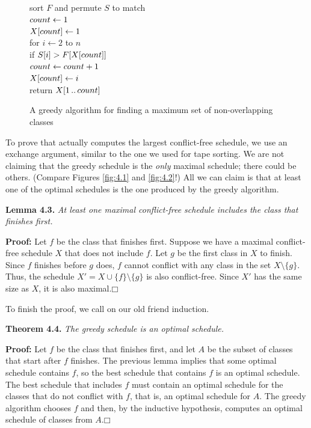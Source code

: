 \begin{figure}[ht]
\centering
\begin{pseudocode}
\\
sort $F$ and permute $S$ to match\\
$count \gets 1$\\
$X[count] \gets 1$\\
for $i \gets 2$ to $n$\\
\Indent if $S[i] > F[X[count]]$\\
\Indent\Indent $count \gets count + 1$\\
\Indent\Indent $X[count] \gets i$\\
return $X[1\,..\,count]$
\end{pseudocode}
\caption{A greedy algorithm for finding a maximum set of non-overlapping classes}
\label{fig:4.3}
\end{figure}

To prove that  actually computes the largest conflict-free schedule, we use an exchange argument, similar to the one we used for tape sorting.
We are not claiming that the greedy schedule is the \textit{only} maximal schedule; there could be others.
(Compare Figures \ref{fig:4.1} and \ref{fig:4.2}!)
All we can claim is that at least one of the optimal schedules is the one produced by the greedy algorithm.

\noindent\textbf{Lemma 4.3.} \textsl{At least one maximal conflict-free schedule includes the class that finishes first.}

\noindent\textbf{Proof:} Let $f$ be the class that finishes first.
Suppose we have a maximal conflict-free schedule $X$ that does not include $f$.
Let $g$ be the first class in $X$ to finish.
Since $f$ finishes before $g$ does, $f$ cannot conflict with any class in the set $X \setminus \{g\}$.
Thus, the schedule $X' = X \cup \{f\} \setminus \{g\}$ is also conflict-free.
Since $X'$ has the same size as $X$, it is also maximal.\hfill$\mdlgwhtsquare$

To finish the proof, we call on our old friend induction.

\noindent\textbf{Theorem 4.4.} \textsl{The greedy schedule is an optimal schedule.}

\noindent\textbf{Proof:} Let $f$ be the class that finishes first, and let $A$ be the subset of classes that start after $f$ finishes.
The previous lemma implies that some optimal schedule contains $f$, so the best schedule that contains $f$ is an optimal schedule.
The best schedule that includes $f$ must contain an optimal schedule for the classes that do not conflict with $f$, that is, an optimal schedule for $A$.
The greedy algorithm chooses $f$ and then, by the inductive hypothesis, computes an optimal schedule of classes from $A$.\hfill$\mdlgwhtsquare$

